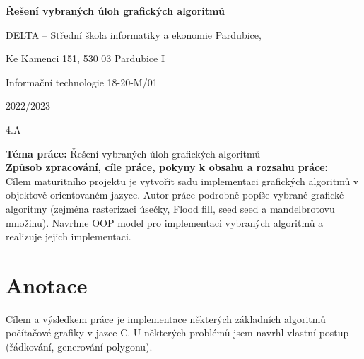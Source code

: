 \documentclass[a4paper,12pt]{report}
\begin{document}
\begin{titlepage}
	\begin{center}
	{\LARGE \textbf{Řešení vybraných úloh grafických algoritmů} \par}
	\end{center}
	
	\vfill
	
	{\large \par DELTA – Střední škola informatiky a ekonomie Pardubice, \par Ke Kamenci 151, 530 03 Pardubice I \par}
		{\large Informační technologie 18-20-M/01 \par}
	\vspace{0.1cm}
	{\large 2022/2023 \par}
	\vspace{0.1cm}
	{\large 4.A \par}
	\vspace{1cm}
\end{titlepage}





\noindent \textbf{Téma práce:} Řešení vybraných úloh grafických algoritmů \\
\noindent \textbf{Způsob zpracování, cíle práce, pokyny k obsahu a rozsahu práce:} \\
Cílem maturitního projektu je vytvořit sadu implementaci grafických algoritmů v objektově orientovaném jazyce. Autor práce podrobně popíše vybrané grafické algoritmy (zejména rasterizaci úsečky, Flood fill, seed seed a mandelbrotovu množinu). Navrhne OOP model pro implementaci vybraných algoritmů a realizuje jejich implementaci.
\vfill
\clearpage


\section*{Anotace}
Cílem a výsledkem práce je implementace některých základních algoritmů počítačové grafiky v jazce C. U některých problémů jsem navrhl vlastní postup (řádkování, generování polygonu).
\end{document}
